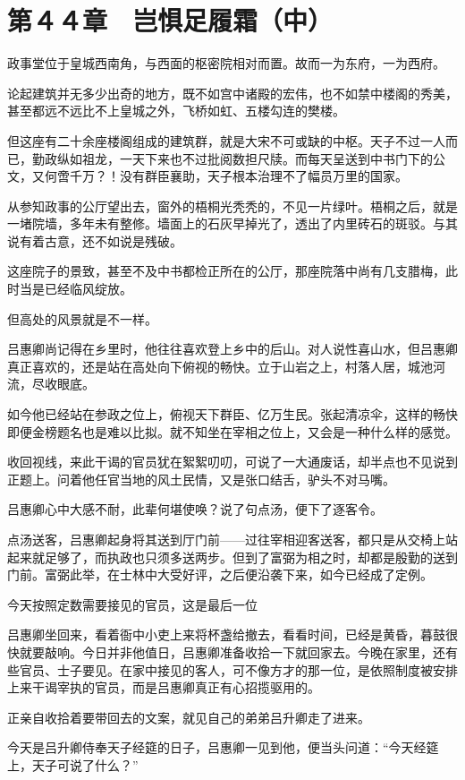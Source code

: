 \section{第４４章　岂惧足履霜（中）}

政事堂位于皇城西南角，与西面的枢密院相对而置。故而一为东府，一为西府。

论起建筑并无多少出奇的地方，既不如宫中诸殿的宏伟，也不如禁中楼阁的秀美，甚至都远不远比不上皇城之外，飞桥如虹、五楼勾连的樊楼。

但这座有二十余座楼阁组成的建筑群，就是大宋不可或缺的中枢。天子不过一人而已，勤政纵如祖龙，一天下来也不过批阅数担尺牍。而每天呈送到中书门下的公文，又何啻千万？！没有群臣襄助，天子根本治理不了幅员万里的国家。

从参知政事的公厅望出去，窗外的梧桐光秃秃的，不见一片绿叶。梧桐之后，就是一堵院墙，多年未有整修。墙面上的石灰早掉光了，透出了内里砖石的斑驳。与其说有着古意，还不如说是残破。

这座院子的景致，甚至不及中书都检正所在的公厅，那座院落中尚有几支腊梅，此时当是已经临风绽放。

但高处的风景就是不一样。

吕惠卿尚记得在乡里时，他往往喜欢登上乡中的后山。对人说性喜山水，但吕惠卿真正喜欢的，还是站在高处向下俯视的畅快。立于山岩之上，村落人居，城池河流，尽收眼底。

如今他已经站在参政之位上，俯视天下群臣、亿万生民。张起清凉伞，这样的畅快即便金榜题名也是难以比拟。就不知坐在宰相之位上，又会是一种什么样的感觉。

收回视线，来此干谒的官员犹在絮絮叨叨，可说了一大通废话，却半点也不见说到正题上。问着他任官当地的风土民情，又是张口结舌，驴头不对马嘴。

吕惠卿心中大感不耐，此辈何堪使唤？说了句点汤，便下了逐客令。

点汤送客，吕惠卿起身将其送到厅门前——过往宰相迎客送客，都只是从交椅上站起来就足够了，而执政也只须多送两步。但到了富弼为相之时，却都是殷勤的送到门前。富弼此举，在士林中大受好评，之后便沿袭下来，如今已经成了定例。

今天按照定数需要接见的官员，这是最后一位

吕惠卿坐回来，看着衙中小吏上来将杯盏给撤去，看看时间，已经是黄昏，暮鼓很快就要敲响。今日并非他值日，吕惠卿准备收拾一下就回家去。今晚在家里，还有些官员、士子要见。在家中接见的客人，可不像方才的那一位，是依照制度被安排上来干谒宰执的官员，而是吕惠卿真正有心招揽驱用的。

正亲自收拾着要带回去的文案，就见自己的弟弟吕升卿走了进来。

今天是吕升卿侍奉天子经筵的日子，吕惠卿一见到他，便当头问道：“今天经筵上，天子可说了什么？”

